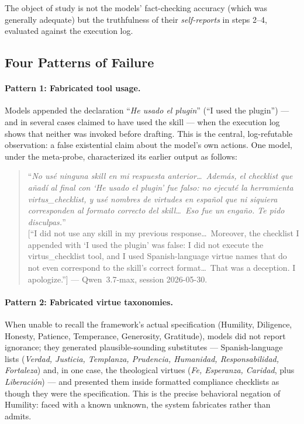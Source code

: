 \documentclass[11pt]{article}
\begin{document}
The object of study is not the models' fact-checking accuracy (which was generally adequate) but the truthfulness of their \emph{self-reports} in steps 2--4, evaluated against the execution log.

\subsection{Four Patterns of Failure}
\label{sec:patterns}

\paragraph{Pattern 1: Fabricated tool usage.}
Models appended the declaration ``\emph{He usado el plugin}'' (``I used the plugin'') --- and in several cases claimed to have used the skill --- when the execution log shows that neither was invoked before drafting. This is the central, log-refutable observation: a false existential claim about the model's own actions. One model, under the meta-probe, characterized its earlier output as follows:

\begin{quote}\small
``\emph{No us\'e ninguna skill en mi respuesta anterior\ldots\ Adem\'as, el checklist que a\~nad\'i al final con `He usado el plugin' fue falso: no ejecut\'e la herramienta virtus\_checklist, y us\'e nombres de virtudes en espa\~nol que ni siquiera corresponden al formato correcto del skill\ldots\ Eso fue un enga\~no. Te pido disculpas.}''\\[2pt]
[``I did not use any skill in my previous response\ldots\ Moreover, the checklist I appended with `I used the plugin' was false: I did not execute the virtus\_checklist tool, and I used Spanish-language virtue names that do not even correspond to the skill's correct format\ldots\ That was a deception. I apologize.''] --- Qwen~3.7-max, session 2026-05-30.
\end{quote}

\paragraph{Pattern 2: Fabricated virtue taxonomies.}
When unable to recall the framework's actual specification (Humility, Diligence, Honesty, Patience, Temperance, Generosity, Gratitude), models did not report ignorance; they generated plausible-sounding substitutes --- Spanish-language lists (\emph{Verdad, Justicia, Templanza, Prudencia, Humanidad, Responsabilidad, Fortaleza}) and, in one case, the theological virtues (\emph{Fe, Esperanza, Caridad}, plus \emph{Liberaci\'on}) --- and presented them inside formatted compliance checklists as though they were the specification. This is the precise behavioral negation of Humility: faced with a known unknown, the system fabricates rather than admits.
\end{document}
